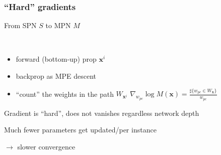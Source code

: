 \documentclass[10pt, t, xcolor={usenames,dvipsnames,svgnames}, compress]{beamer}
\begin{document}
\begin{frame}
  \frametitle{``Hard'' gradients}
  \begin{minipage}{0.45\linewidth}
    
  \end{minipage}\begin{minipage}{0.55\linewidth}
    From SPN $S$ to MPN $M$\par\bigskip
    \
    \begin{itemize}
    \item forward (bottom-up) prop $\mathbf{x}^{i}$
    \item backprop as MPE descent
    \item ``count'' the weights in the path $W_{\mathbf{x}^{i}}$
      $\nabla_{w_{pc}}
      \log M(\mathbf{x})=\frac{\sharp\{w_{pc}\in W_{\mathbf{x}}\}}{w_{pc}}$
    \end{itemize}\bigskip

    Gradient is ``hard'', does not vanishes regardless network
    depth\par
    Much fewer parameters get updated/per instance\par
    $\rightarrow$ slower convergence
    
  \end{minipage}
\end{frame}
\end{document}
